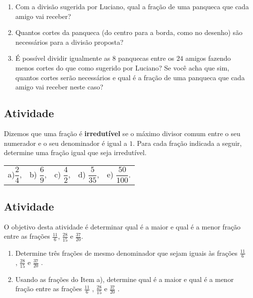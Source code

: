 \documentclass[a4,12pt]{book}
\begin{document}
\begin{enumerate} [\quad a)] %
  \item     Com a divisão sugerida por Luciano, qual a fração de uma panqueca que cada amigo vai receber?
  \item     Quantos cortes da panqueca (do centro para a borda, como no desenho) são necessários para a divisão proposta?
  \item     É possível dividir igualmente as     $8$     panquecas entre os     $24$     amigos fazendo menos cortes do que como sugerido por Luciano? Se você acha que sim, quantos cortes serão necessários e qual é a fração de uma panqueca que cada amigo vai receber neste caso?
\end{enumerate} %

\subsection{Atividade}

Dizemos que uma fração é {\bf irredutível} se o máximo divisor comum entre o seu numerador e o seu denominador é igual a $1$. Para cada fração indicada a seguir, determine uma fração igual que seja irredutível.

\begin{tabular}{m{}m{}m{}m{}m{}}
a)$\dfrac{2}{4}$, & b) $\dfrac{6}{9}$, & c) $\dfrac{4}{2}$, & d) $\dfrac{5}{35}$, & e) $\dfrac{50}{100}$. 
\end{tabular}

\subsection{Atividade}

O objetivo desta atividade é determinar qual é a maior e qual é a menor fração entre
as frações $\frac{11}{6}$, $\frac{28}{15}$ e $\frac{37}{20}$.

\begin{enumerate} [\quad a)] %
  \item     Determine três frações de mesmo denominador que sejam iguais às frações     $\frac{11}{6}$    ,     $\frac{28}{15}$     e     $\frac{37}{20}$    .
  \item     Usando as frações do Item a), determine qual é a maior e qual é a menor fração entre as frações     $\frac{11}{6}$    ,     $\frac{28}{15}$     e     $\frac{37}{20}$    .
\end{enumerate} %
\end{document}
